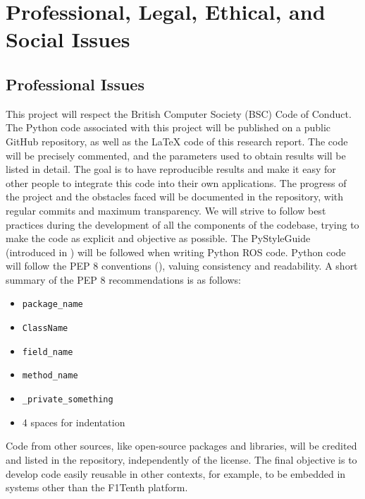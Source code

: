 
\chapter{Professional, Legal, Ethical, and Social Issues} %

\label{Chapter4} %



\section{Professional Issues}
\label{proiss}
This project will respect the British Computer Society (BSC) Code of Conduct. \newline
The Python code associated with this project will be published on a public GitHub repository, as well as the \LaTeX $ $ code of this research report. The code will be precisely commented, and the parameters used to obtain results will be listed in detail. The goal is to have reproducible results and make it easy for other people to integrate this code into their own applications.
\newline
The progress of the project and the obstacles faced will be documented in the repository, with regular commits and maximum transparency. We will strive to follow best practices during the development of all the components of the codebase, trying to make the code as explicit and objective as possible. The PyStyleGuide (introduced in \cite{rossyntax}) will be followed when writing Python ROS code. Python code will follow the PEP 8 conventions (\cite{pysyntax}), valuing consistency and readability. A short summary of the PEP 8 recommendations is as follows:
\begin{itemize}
	\item \verb |package_name|
	\item \verb |ClassName|
	\item \verb |field_name|
	\item \verb |method_name|
	\item \verb |_private_something|
	\item 4 spaces for indentation
\end{itemize}

Code from other sources, like open-source packages and libraries, will be credited and listed in the repository, independently of the license.
\newline
The final objective is to develop code easily reusable in other contexts, for example, to be embedded in systems other than the F1Tenth platform.
